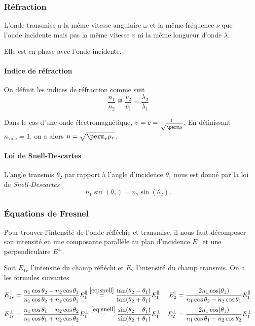 \subsubsection{Réfraction}
L'onde transmise a la même vitesse angulaire $\omega$
et la même fréquence $\nu$ que l'onde incidente
mais pas la même vitesse $v$ ni la même longueur d'onde $\lambda$.

Elle est en phase avec l'onde incidente.

\paragraph{Indice de réfraction}
On définit les indices de réfraction comme suit
\[ \frac{n_1}{n_2} \eqdef \frac{v_2}{v_1} = \frac{\lambda_2}{\lambda_1} \]

Dans le cas d'une onde électromagnétique,
$v = c = \frac{1}{\sqrt{\perm\mu}}$.
En définissant $n_\mathrm{vide} = 1$,
on a alors
$n = \sqrt{\perm_r\mu_r}$.

\paragraph{Loi de Snell-Descartes}
L'angle transmis $\theta_2$ par rapport à l'angle d'incidence
$\theta_1$ nous est donné par la loi de \emph{Snell-Descartes}
\begin{equation}
  \label{eq:snell}
  n_1 \sin(\theta_1) = n_2 \sin(\theta_2).
\end{equation}

\subsubsection{Équations de Fresnel}
Pour trouver l'intensité de l'onde réfléchie et transmise, il nous
faut décomposer son intensité en une composante parallèle au plan d'incidence
$E^\parallel$ et une perpendiculaire $E^\perp$.

Soit $E_{1r}$ l'intensité du champ réfléchi
et $E_{2}$ l'intensité du champ transmis.
On a les formules suivantes
\begin{align*}
  E_{1r}^\parallel & = \frac{n_1\cos\theta_2 - n_2\cos\theta_1}
  {n_1\cos\theta_2 + n_2\cos\theta_1}E_{1}^\parallel
  \stackrel{\eqref{eq:snell}}{=}
  \frac{\tan(\theta_2 - \theta_1)}{\tan(\theta_2 + \theta_1)}E_1^\parallel
  & E_2^\parallel & = \frac{2n_1\cos(\theta_1)}
  {n_1\cos\theta_2 - n_2\cos\theta_1}E_{1}^\parallel\\
  E_{1r}^\perp & = \frac{n_1\cos\theta_1 - n_2\cos\theta_2}
  {n_1\cos\theta_1 + n_2\cos\theta_2}E_{1}^\perp
  \stackrel{\eqref{eq:snell}}{=}
  \frac{\sin(\theta_2 - \theta_1)}{\sin(\theta_2 + \theta_1)}E_1^\perp
  & E_2^\perp & = \frac{2n_1\cos(\theta_1)}
  {n_1\cos\theta_1 - n_2\cos\theta_2}E_{1}^\perp\\
\end{align*}

